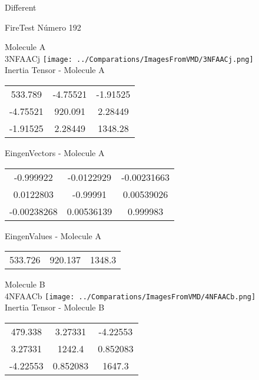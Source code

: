 \begin{center}
\vtab
\vtab
\textcolor{NavyBlue}{\Large Different}
\end{center}

 \newpage

\vtab[-2cm]
\begin{center}
{\large FireTest \tab Número 192}
\end{center}
\begin{multicols}{2}
\begin{center}

Molecule A \\ 
3NFAACj
\texttt{[image: ../Comparations/ImagesFromVMD/3NFAACj.png]}
\\
Inertia Tensor - Molecule A \\
\vtab

\begin{tabular}{|c c c|}
533.789	 & 	-4.75521	 & 	-1.91525	 \\
-4.75521	 & 	920.091	 & 	2.28449	 \\
-1.91525	 & 	2.28449	 & 	1348.28
\end{tabular}

\vtab
 EingenVectors - Molecule A     \\
\vtab
\begin{tabular}{|c c c|}
-0.999922	 & 	-0.0122929	 & 	-0.00231663	 \\
0.0122803	 & 	-0.99991	 & 	0.00539026	 \\
-0.00238268	 & 	0.00536139	 & 	0.999983
\end{tabular}

\vtab
 EingenValues - Molecule A     \\
\vtab
\begin{tabular}{|c c c|}
533.726	 & 	920.137	 & 	1348.3	 \\
\end{tabular}
\columnbreak

Molecule B \\ 
4NFAACb
\texttt{[image: ../Comparations/ImagesFromVMD/4NFAACb.png]}
\\
Inertia Tensor - Molecule B \\
\vtab

\begin{tabular}{|c c c|}
479.338	 & 	3.27331	 & 	-4.22553	 \\
3.27331	 & 	1242.4	 & 	0.852083	 \\
-4.22553	 & 	0.852083	 & 	1647.3
\end{tabular}


\end{center}
\end{multicols}
